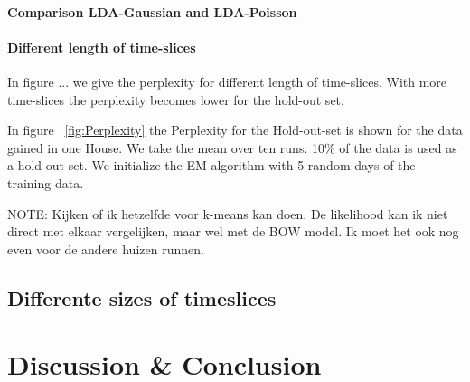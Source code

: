 \documentclass[11pt,a4paper]{article}
\begin{document}
\paragraph{Comparison LDA-Gaussian and LDA-Poisson}

\paragraph{Different length of time-slices}

In figure ... we give the perplexity for different length of time-slices. With more time-slices the perplexity becomes lower for the hold-out set.

In figure ~\ref{fig:Perplexity} the Perplexity for the Hold-out-set is shown for the data gained in one House. We take the mean over ten runs. 10\% of the data is used as a hold-out-set. We initialize the EM-algorithm with 5 random days of the training data.


NOTE:
Kijken of ik hetzelfde voor k-means kan doen. De likelihood kan ik niet direct met elkaar vergelijken, maar wel met de BOW model. Ik moet het ook nog even voor de andere huizen runnen.

\subsection{Differente sizes of timeslices}

% 
% 

\pagebreak
 
\section{Discussion \& Conclusion}
\label{sec:DisCon}
\end{document}
